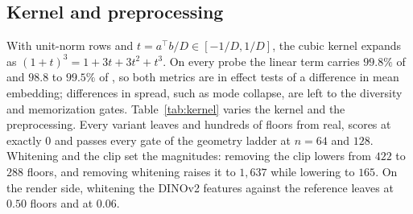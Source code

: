 \subsection{Kernel and preprocessing}
\label{app:kernel}

With unit-norm rows and $t = a^{\top}b/D \in [-1/D, 1/D]$, the cubic kernel expands as
$(1+t)^3 = 1 + 3t + 3t^2 + t^3$. On every probe the linear term carries $99.8\%$ of \mvkid{}
and $98.8$ to $99.5\%$ of \vkid{}, so both metrics are in effect tests of a difference in mean
embedding; differences in spread, such as mode collapse, are left to the diversity and
memorization gates. Table~\ref{tab:kernel} varies the kernel and the preprocessing. Every
\vkid{} variant leaves \solidify{} and \hollow{} hundreds of floors from real, scores
\matshuffle{} at exactly $0$ and passes every gate of the geometry ladder at $n{=}64$ and
$128$. Whitening and the clip set the magnitudes: removing the clip lowers \solidify{} from
$422$ to $288$ floors, and removing whitening raises it to $1{,}637$ while lowering
\growshell{} to $165$. On the render side, whitening the DINOv2 features against the
reference leaves \solidify{} at $0.50$ floors and \hollow{} at $0.06$.

